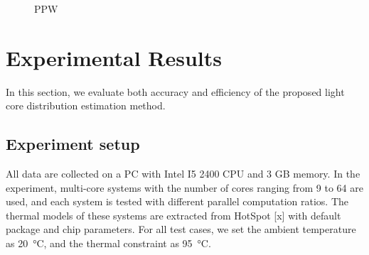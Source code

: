 \begin{figure}[htb]
\centering
{}%
%
\caption{PPW}  
\label{fig:ppw}
\end{figure}


\section{Experimental Results}

In this section, we evaluate both accuracy and efficiency of the proposed light core distribution estimation method. 

\subsection{Experiment setup}
All data are collected on a PC with Intel I5 2400 CPU and 3 GB memory. In the experiment, multi-core systems with the number of cores ranging from 9 to 64 are used, and each system is tested with different parallel computation ratios. The thermal models of these systems are extracted from HotSpot [x] with default package and chip parameters. For all test cases, we set the ambient temperature as \SI{20}{\degreeCelsius}, and the thermal constraint as \SI{95}{\degreeCelsius}. 

